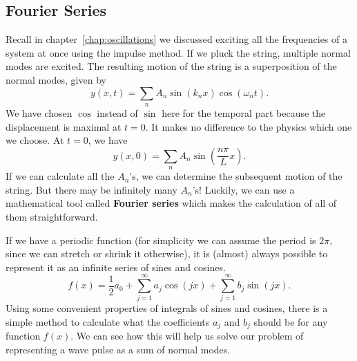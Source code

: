 \documentclass[../classical_mechanics.tex]{subfiles}
\begin{document}
        \subsection{Fourier Series}\label{subsec:fourier-series}
            Recall in chapter~\ref{chap:oscillations} we discussed exciting all the frequencies of a system at once using the impulse method.
            If we pluck the string, multiple normal modes are excited.
            The resulting motion of the string is a superposition of the normal modes, given by
            \begin{equation}
                y(x,t)=\sum_n A_n\sin(k_n x)\cos(\omega_n t).
            \end{equation}
            We have chosen $\cos$ instead of $\sin$ here for the temporal part because the displacement is maximal at $t=0$.
            It makes no difference to the physics which one we choose.
            At $t=0$, we have
            \begin{equation}\label{eq:waves:plucked-string-initial-conditions}
                y(x,0)=\sum_n A_n\sin\left(\frac{n\pi}{L}x\right).
            \end{equation}
            If we can calculate all the $A_n$'s, we can determine the subsequent motion of the string.
            But there may be infinitely many $A_n$'s!
            Luckily, we can use a mathematical tool called \textbf{Fourier series} which makes the calculation of all of them straightforward.

            If we have a periodic function (for simplicity we can assume the period is $2\pi$, since we can stretch or shrink it otherwise), it is (almost) always possible to represent it as an infinite series of sines and cosines.
            \begin{equation}\label{eq:waves:fourier-series}
                f(x)=\frac{1}{2}a_0+\sum_{j=1}^\infty a_j\cos(jx)+\sum_{j=1}^\infty b_j\sin(jx).
            \end{equation}
            Using some convenient properties of integrals of sines and cosines, there is a simple method to calculate what the coefficients $a_j$ and $b_j$ should be for any function $f(x)$.
            We can see how this will help us solve our problem of representing a wave pulse as a sum of normal modes.
\end{document}
